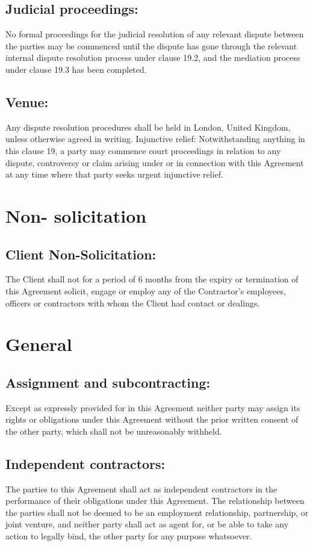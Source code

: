 \documentclass[a4paper,12pt]{article}
\begin{document}
\subsection{Judicial proceedings:}  No formal proceedings for the judicial resolution of any relevant dispute between the parties may be commenced until the dispute has gone through the relevant internal dispute resolution process under clause 19.2, and the mediation process under clause 19.3 has been completed.
\subsection{Venue:}  Any dispute resolution procedures shall be held in London, United Kingdom, unless otherwise agreed in writing.
Injunctive relief:  Notwithstanding anything in this clause 19, a party may commence court proceedings in relation to any dispute, controversy or claim arising under or in connection with this Agreement at any time where that party seeks urgent injunctive relief.

\section{Non- solicitation}
\subsection{Client Non-Solicitation:} The Client shall not for a period of 6 months from the expiry or termination of this Agreement solicit, engage or employ any of the Contractor’s employees, officers or contractors with whom the Client had contact or dealings. 

\section{General}
\subsection{Assignment and subcontracting:}  Except as expressly provided for in this Agreement neither party may assign its rights or obligations under this Agreement without the prior written consent of the other party, which shall not be unreasonably withheld.
\subsection{Independent contractors:}  The parties to this Agreement shall act as independent contractors in the performance of their obligations under this Agreement.  The relationship between the parties shall not be deemed to be an employment relationship, partnership, or joint venture, and neither party shall act as agent for, or be able to take any action to legally bind, the other party for any purpose whatsoever.
\end{document}
